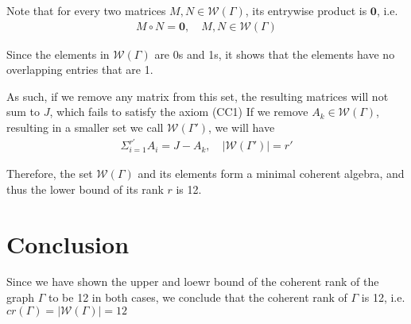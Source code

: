 \documentclass{article}
\begin{document}
Note that for every two matrices $M,N\in\mathcal{W}(\Gamma)$, its entrywise product is $\mathbf{0}$, i.e.
\begin{align*}
    M\circ N = \mathbf{0}, \quad M,N\in\mathcal{W}(\Gamma)
\end{align*}

Since the elements in $\mathcal{W}(\Gamma)$ are 0s and 1s, it shows that the elements have no overlapping entries that are 1.

As such, if we remove any matrix from this set, the resulting matrices will not sum to $J$, which fails to satisfy the axiom (CC1)
If we remove $A_k\in \mathcal{W}(\Gamma)$, resulting in a smaller set we call $\mathcal{W}(\Gamma')$, we will have
\begin{align*}
    \Sigma_{i=1}^{r'} A_i= J -A_k,\quad |\mathcal{W}(\Gamma')| = r'
\end{align*}

Therefore, the set $\mathcal{W}(\Gamma)$ and its elements form a minimal coherent algebra, and thus the lower bound of its rank $r$ is 12.

\section*{Conclusion}
Since we have shown the upper and loewr bound of the coherent rank of the graph $\Gamma$ to be 12 in both cases, we conclude that the coherent rank of $\Gamma$ is 12, i.e. $cr(\Gamma) = |\mathcal{W}(\Gamma)| = 12$
\end{document}
